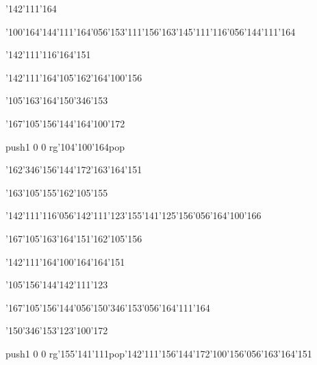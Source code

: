 \null\vfill\ipa\centerline{\enskip\char'142\char'111\char'164\enskip\enskip\enskip\enskip\enskip\enskip\enskip}\medskip\centerline{\enskip\char'100\char'164\enskip\enskip\enskip\char'144\char'111\char'164\char'056\char'153\char'111\char'156\enskip\char'163\char'145\char'111\char'116\char'056\char'144\char'111\char'164}\medskip\centerline{\enskip\char'142\char'111\char'116\enskip\enskip\enskip\enskip\enskip\enskip\enskip\char'164\char'151\enskip\enskip\enskip\enskip}\medskip\centerline{\enskip\char'142\char'111\char'164\enskip\enskip\enskip\enskip\enskip\char'105\char'162\enskip\enskip\enskip\char'164\char'100\char'156}\medskip\centerline{\enskip\char'105\char'163\char'164\enskip\enskip\enskip\enskip\enskip\enskip\enskip\char'150\char'346\char'153}\medskip\centerline{\enskip\enskip\enskip\enskip\enskip\char'167\char'105\char'156\char'144\enskip\enskip\enskip\enskip\char'164\char'100\char'172}\medskip\centerline{\enskip\enskip\enskip\enskip\enskip\enskip\enskip\enskip\enskip\enskip\enskip\pdfcolorstack\match push{1 0 0 rg}\char'104\char'100\char'164\pdfcolorstack\match pop{}}\medskip\centerline{\enskip\enskip\enskip\enskip\enskip\char'162\char'346\char'156\char'144\char'172\enskip\enskip\enskip\enskip\enskip\enskip\char'163\char'164\char'151}\medskip\vfill\footline{\hfil\tt\folio\hfil}\eject
\null\vfill\ipa\centerline{\enskip\char'163\char'105\char'155\enskip\enskip\enskip\enskip\char'162\char'105\char'155}\medskip\centerline{\enskip\enskip\enskip\enskip\enskip\enskip\char'142\char'111\char'116\char'056\char'142\char'111\char'123\enskip\char'155\char'141\char'125\char'156\char'056\char'164\char'100\char'166}\medskip\centerline{\enskip\char'167\char'105\char'163\enskip\enskip\enskip\enskip\char'164\char'151\enskip\enskip\enskip\enskip\char'162\char'105\char'156}\medskip\centerline{\enskip\char'142\char'111\char'164\enskip\enskip\enskip\enskip\enskip\char'100\char'164\enskip\char'164\char'151\enskip\enskip\enskip\enskip}\medskip\centerline{\enskip\char'105\char'156\char'144\enskip\enskip\enskip\enskip\enskip\enskip\enskip\char'142\char'111\char'123}\medskip\centerline{\enskip\enskip\enskip\enskip\enskip\char'167\char'105\char'156\char'144\char'056\char'150\char'346\char'153\char'056\char'164\char'111\char'164}\medskip\centerline{\enskip\enskip\enskip\enskip\enskip\enskip\enskip\char'150\char'346\char'153\enskip\char'123\char'100\char'172}\medskip\centerline{\enskip\pdfcolorstack\match push{1 0 0 rg}\char'155\char'141\char'111\pdfcolorstack\match pop{}\enskip\char'142\char'111\char'156\char'144\char'172\enskip\enskip\enskip\enskip\char'100\char'156\char'056\char'163\char'164\char'151}\medskip\vfill\footline{\hfil\tt\folio\hfil}\eject
